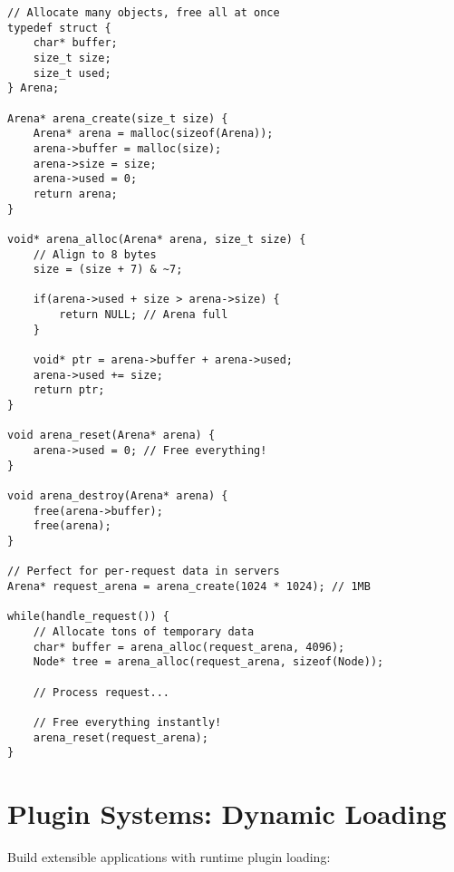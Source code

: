 \begin{lstlisting}
// Allocate many objects, free all at once
typedef struct {
    char* buffer;
    size_t size;
    size_t used;
} Arena;

Arena* arena_create(size_t size) {
    Arena* arena = malloc(sizeof(Arena));
    arena->buffer = malloc(size);
    arena->size = size;
    arena->used = 0;
    return arena;
}

void* arena_alloc(Arena* arena, size_t size) {
    // Align to 8 bytes
    size = (size + 7) & ~7;

    if(arena->used + size > arena->size) {
        return NULL; // Arena full
    }

    void* ptr = arena->buffer + arena->used;
    arena->used += size;
    return ptr;
}

void arena_reset(Arena* arena) {
    arena->used = 0; // Free everything!
}

void arena_destroy(Arena* arena) {
    free(arena->buffer);
    free(arena);
}

// Perfect for per-request data in servers
Arena* request_arena = arena_create(1024 * 1024); // 1MB

while(handle_request()) {
    // Allocate tons of temporary data
    char* buffer = arena_alloc(request_arena, 4096);
    Node* tree = arena_alloc(request_arena, sizeof(Node));

    // Process request...

    // Free everything instantly!
    arena_reset(request_arena);
}
\end{lstlisting}

\section{Plugin Systems: Dynamic Loading}

Build extensible applications with runtime plugin loading:

